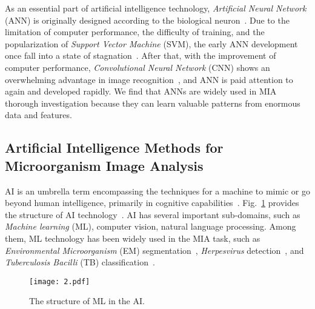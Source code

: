 As an essential part of artificial intelligence technology, \emph{Artificial Neural Network} (ANN) is originally designed according to the biological neuron~\cite{Mcculloch-1943-ALCI}. Due to the limitation of computer performance, the difficulty of training, and the popularization of \emph{Support Vector Machine} (SVM), the early ANN development once fall into a state of stagnation~\cite{Yamashita-2016-AIGD}. After that, with the improvement of computer performance, \emph{Convolutional Neural Network} (CNN) shows an overwhelming advantage in image recognition~\cite{Krizhevsky-2017-ICDC}, and ANN is paid attention to again and developed rapidly. We find that ANNs are widely used in MIA thorough investigation because they can learn valuable patterns from enormous data and features.



\subsection{Artificial Intelligence Methods for Microorganism Image Analysis}

AI is an umbrella term encompassing the techniques for a machine to mimic or go beyond human intelligence, primarily in cognitive capabilities~\cite{Robertson-2018-DIAB}. Fig.~\ref{fig2} provides the structure of AI technology~\cite{Linnosmaa-2020-MLSC,Zhou-2020-ACRB}. AI has several important sub-domains, such as \emph{Machine learning} (ML), computer vision, natural language processing. Among them, ML technology has been widely used in the MIA task, such as \emph{Environmental Microorganism} (EM) segmentation~\cite{Li-2020-MAMR,Zhang-2020-AMCF}, \emph{Herpesvirus} detection~\cite{Devan-2019-DHCT}, and \emph{Tuberculosis Bacilli} (TB) classification~\cite{Rulaningtyas-2011-ACTB,Osman-2012-OSEL}. 

\begin{figure}[htbp!]
\centering
\texttt{[image: 2.pdf]}
\caption{The structure of ML in the AI.}
\label{fig2}
\end{figure}

